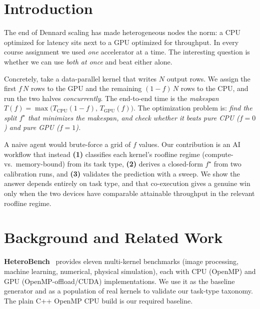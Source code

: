 \documentclass[conference]{IEEEtran}
\begin{document}
\vspace{0.5em}
\noindent{}

\section{Introduction}

The end of Dennard scaling has made heterogeneous nodes the norm: a CPU optimized for
latency sits next to a GPU optimized for throughput. In every course assignment we used
\emph{one} accelerator at a time. The interesting question is whether we can use
\emph{both at once} and beat either alone.

Concretely, take a data-parallel kernel that writes $N$ output rows. We assign the
first $f\,N$ rows to the GPU and the remaining $(1{-}f)\,N$ rows to the CPU, and run the
two halves \emph{concurrently}. The end-to-end time is the \emph{makespan}
$T(f)=\max\bigl(T_\mathrm{CPU}(1{-}f),\,T_\mathrm{GPU}(f)\bigr)$. The optimization
problem is: \emph{find the split $f^\star$ that minimizes the makespan, and check whether
it beats pure CPU ($f{=}0$) and pure GPU ($f{=}1$).}

A naive agent would brute-force a grid of $f$ values. Our contribution is an AI workflow
that instead \textbf{(1)} classifies each kernel's roofline regime (compute- vs.\
memory-bound) from its task type, \textbf{(2)} derives a closed-form $f^\star$ from two
calibration runs, and \textbf{(3)} validates the prediction with a sweep. We show the
answer depends entirely on task type, and that co-execution gives a genuine win only when
the two devices have comparable attainable throughput in the relevant roofline regime.

\section{Background and Related Work}

\textbf{HeteroBench}~\cite{heterobench} provides eleven multi-kernel benchmarks
(image processing, machine learning, numerical, physical simulation), each with CPU
(OpenMP) and GPU (OpenMP-offload/CUDA) implementations. We use it as the baseline
generator and as a population of real kernels to validate our task-type taxonomy. The
plain C++ OpenMP CPU build is our required baseline.
\end{document}
